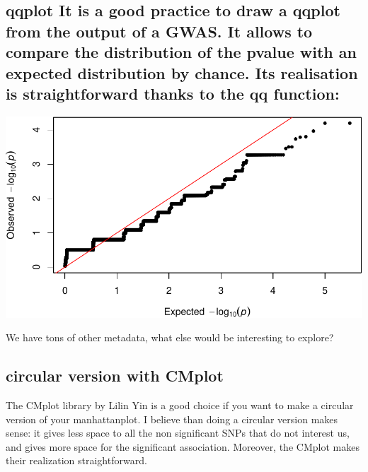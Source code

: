 \documentclass[
]{article}
\newenvironment{Shaded}{\begin{snugshade}}{\end{snugshade}}
\newcommand{\KeywordTok}[1]{\textcolor[rgb]{0.13,0.29,0.53}{\textbf{#1}}}
\newcommand{\NormalTok}[1]{#1}
\newcommand{\OperatorTok}[1]{\textcolor[rgb]{0.81,0.36,0.00}{\textbf{#1}}}
\begin{document}
\hypertarget{qqplot-it-is-a-good-practice-to-draw-a-qqplot-from-the-output-of-a-gwas.-it-allows-to-compare-the-distribution-of-the-pvalue-with-an-expected-distribution-by-chance.-its-realisation-is-straightforward-thanks-to-the-qq-function}{%
\subsection{qqplot It is a good practice to draw a qqplot from the
output of a GWAS. It allows to compare the distribution of the pvalue
with an expected distribution by chance. Its realisation is
straightforward thanks to the qq
function:}\label{qqplot-it-is-a-good-practice-to-draw-a-qqplot-from-the-output-of-a-gwas.-it-allows-to-compare-the-distribution-of-the-pvalue-with-an-expected-distribution-by-chance.-its-realisation-is-straightforward-thanks-to-the-qq-function}}

\begin{Shaded}
\end{Shaded}

\includegraphics{GWASvisualizations_files/figure-latex/unnamed-chunk-13-1.pdf}

We have tons of other metadata, what else would be interesting to
explore?

\hypertarget{circular-version-with-cmplot}{%
\subsection{circular version with
CMplot}\label{circular-version-with-cmplot}}

The CMplot library by Lilin Yin is a good choice if you want to make a
circular version of your manhattanplot. I believe than doing a circular
version makes sense: it gives less space to all the non significant SNPs
that do not interest us, and gives more space for the significant
association. Moreover, the CMplot makes their realization
straightforward.
\end{document}
